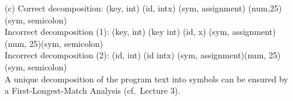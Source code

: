 \begin{solution}
\begin{enumerate}
\item[(c)] Correct decomposition: (key, int) (id, intx) (sym, assignment) (num,25) (sym, semicolon) \\
Incorrect decomposition (1): (key, int) (key int) (id, x) (sym, assignment)(num, 25)(sym, semicolon) \\
Incorrect decomposition (2): (id, int) (id intx) (sym, assignment)(num, 25)(sym, semicolon) \\
%
A unique decomposition of the program text into symbols can be ensured by a First-Longest-Match Analysis (cf.\ Lecture 3).
\end{enumerate}
\end{solution}



